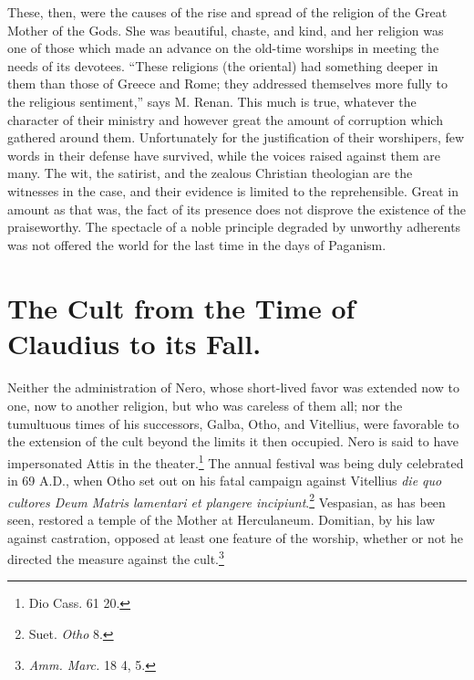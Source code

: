 \documentclass[a4paper, 11pt, oneside, polutonikogreek, english]{article}
\begin{document}
These, then, were the causes of the rise and spread of the religion of the Great Mother of the Gods. She was beautiful, chaste, and kind, and her religion was one of those which made an advance on the old-time worships in meeting the needs of its devotees. ``These religions (the oriental) had something deeper in them than those of Greece and Rome; they addressed themselves more fully to the religious sentiment,'' says M. Renan. This much is true, whatever the character of their ministry and however great the amount of corruption which gathered around them. Unfortunately for the justification of their worshipers, few words in their defense have survived, while the voices raised against them are many. The wit, the satirist, and the zealous Christian theologian are the witnesses in the case, and their evidence is limited to the reprehensible. Great in amount as that was, the fact of its presence does not disprove the existence of the praiseworthy. The spectacle of a noble principle degraded by unworthy adherents was not offered the world for the last time in the days of Paganism.
\clearpage
\section{The Cult from the Time of Claudius to its Fall.}
\paragraph{}
Neither the administration of Nero, whose short-lived favor was extended now to one, now to another religion, but who was careless of them all; nor the tumultuous times of his successors, Galba, Otho, and Vitellius, were favorable to the extension of the cult beyond the limits it then occupied. Nero is said to have impersonated Attis in the theater.\footnote{Dio Cass. 61 20.} The annual festival was being duly celebrated in 69 \textsc{A.D.}, when Otho set out on his fatal campaign against Vitellius \emph{die quo cultores Deum Matris lamentari et plangere incipiunt}.\footnote{Suet. \emph{Otho} 8.} Vespasian, as has been seen, restored a temple of the Mother at Herculaneum. Domitian, by his law against castration, opposed at least one feature of the worship, whether or not he directed the measure against the cult.\footnote{\emph{Amm. Marc.} 18 4, 5.}
\end{document}
